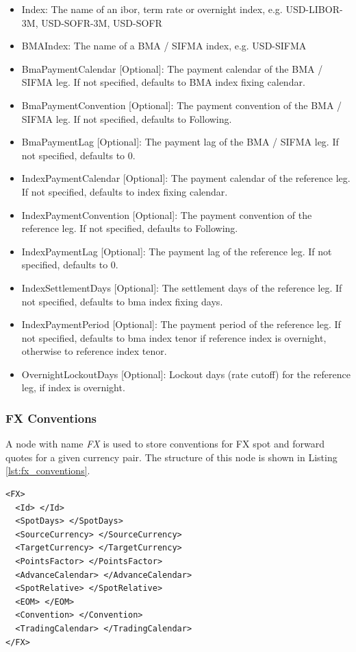 \begin{itemize}
\item Index: The name of an ibor, term rate or overnight index, e.g. USD-LIBOR-3M, USD-SOFR-3M, USD-SOFR
\item BMAIndex: The name of a BMA / SIFMA index, e.g. USD-SIFMA
\item BmaPaymentCalendar [Optional]: The payment calendar of the BMA / SIFMA leg. If not specified, defaults to BMA index fixing calendar.
\item BmaPaymentConvention [Optional]: The payment convention of the BMA / SIFMA leg. If not specified, defaults to Following.
\item BmaPaymentLag [Optional]: The payment lag of the BMA / SIFMA leg. If not specified, defaults to $0$.
\item IndexPaymentCalendar [Optional]: The payment calendar of the reference leg. If not specified, defaults to index fixing calendar.
\item IndexPaymentConvention [Optional]: The payment convention of the reference leg. If not specified, defaults to Following.
\item IndexPaymentLag [Optional]: The payment lag of the reference leg. If not specified, defaults to $0$.
\item IndexSettlementDays [Optional]: The settlement days of the reference leg. If not specified, defaults to bma index fixing days.
\item IndexPaymentPeriod [Optional]: The payment period of the reference leg. If not specified, defaults to bma index
  tenor if reference index is overnight, otherwise to reference index tenor.
\item OvernightLockoutDays [Optional]: Lockout days (rate cutoff) for the reference leg, if index is overnight.
\end{itemize}

\subsubsection{FX Conventions}\label{sss:fx_convention}
A node with name \emph{FX} is used to store conventions for FX spot and forward quotes for a given currency pair. The
structure of this node is shown in Listing \ref{lst:fx_conventions}.

\begin{listing}[H]
\begin{verbatim}
<FX>
  <Id> </Id>
  <SpotDays> </SpotDays>
  <SourceCurrency> </SourceCurrency>
  <TargetCurrency> </TargetCurrency>
  <PointsFactor> </PointsFactor>
  <AdvanceCalendar> </AdvanceCalendar>
  <SpotRelative> </SpotRelative>
  <EOM> </EOM>
  <Convention> </Convention>
  <TradingCalendar> </TradingCalendar>
</FX>
\end{verbatim}
\caption{FX conventions}
\label{lst:fx_conventions}
\end{listing}


